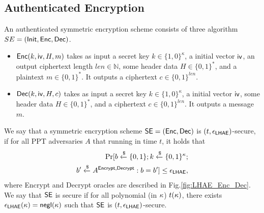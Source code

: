\subsection{Authenticated Encryption} \label{sec:SE}

An authenticated symmetric encryption scheme consists of three algorithm
$SE = (\mathsf{Init}, \mathsf{Enc}, \mathsf{Dec})$.
\begin{itemize}
 \item{$\mathsf{Enc}(k,\mathsf{iv},H,m)$ takes as input a secret key
 $k \in \{1,0\}^{\kappa}$, a initial vector $\mathsf{iv}$, an
 output ciphertext length $len \in \mathbb{N}$, some
 header data $H \in \{0,1\}^{\ast}$, and a plaintext
 $m \in \{0,1\}^{\ast}$.
 It outputs a ciphertext $c \in \{0,1\}^{len}$.}
 \item{$\mathsf{Dec}(k,\mathsf{iv},H,c)$ takes as input a secret key
 $k \in \{1,0\}^{\kappa}$, a initial vector $\mathsf{iv}$,
 some header data $H \in \{0,1\}^{\ast}$, and a
 ciphertext $c \in \{0,1\}^{len}$. It outputs a
 message $m$.}
\end{itemize}

\begin{definition}
 We say that a symmetric encryption scheme
 $\mathsf{SE} = (\mathsf{Enc},\mathsf{Dec})$ is $(t, \epsilon_{\mathsf{LHAE}})$-secure,
 if for all PPT adversaries $A$ that running in time
 $t$, it holds that
 \begin{eqnarray}
  \Pr[b\xleftarrow{\$}\{0,1\}; k\xleftarrow{\$}\{0,1\}^{\kappa}; \nonumber \\
   b^{\prime} \xleftarrow{\$} A^{\mathsf{Encrypt}, \mathsf{Decrypt}} : b = b^{\prime}] \leq \epsilon_{\mathsf{LHAE}},
 \end{eqnarray}
 where Encrypt and Decrypt oracles are described in
 Fig.\ref{fig:LHAE_Enc_Dec}.
 We say that $\mathsf{SE}$ is secure if for all polynomial
 (in $\kappa$) $t(\kappa)$, there exists
 $\epsilon_{\mathsf{LHAE}}(\kappa)=\mathsf{negl}(\kappa)$ such that $\mathsf{SE}$
 is $(t, \epsilon_{\mathsf{LHAE}})$-secure.
\end{definition}

